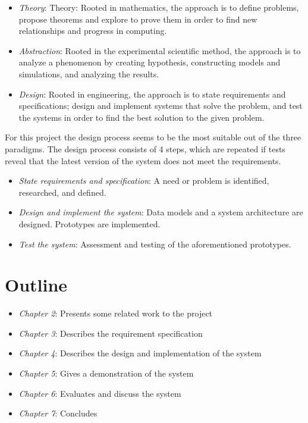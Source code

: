 \begin{itemize}
\item \emph{Theory}: 
Theory: Rooted in mathematics, the approach is to define problems, propose theorems and explore to prove them in order to find new relationships and progress in computing.
\item \emph{Abstraction}: 
Rooted in the experimental scientific method, the approach is to analyze a phenomenon by creating hypothesis, constructing models and simulations, and analyzing the results.
\item \emph{Design}: 
Rooted in engineering, the approach is to state requirements and specifications; design and implement systems that solve the problem, and test the systems in order to find the best solution to the given problem.

\end{itemize}

For this project the design process seems to be the most suitable out of the three paradigms. The design process consists of 4 steps, which are repeated if tests reveal that the latest version of the system does not meet the requirements.

\begin{itemize}
\item \emph{State requirements and specification}: A need or problem is identified, researched, and defined.
\item \emph{Design and implement the system}: Data models and a system architecture are designed. Prototypes are implemented.
\item \emph{Test the system}: Assessment and testing of the aforementioned prototypes.
\end{itemize}

\section{Outline}

\begin{itemize}
\item \emph{Chapter 2}: Presents some related work to the project
\item \emph{Chapter 3}: Describes the requirement specification
\item \emph{Chapter 4}: Describes the design and implementation of the system
\item \emph{Chapter 5}: Gives a demonstration of the system
\item \emph{Chapter 6}: Evaluates and discuss the system
\item \emph{Chapter 7}: Concludes
\end{itemize}






